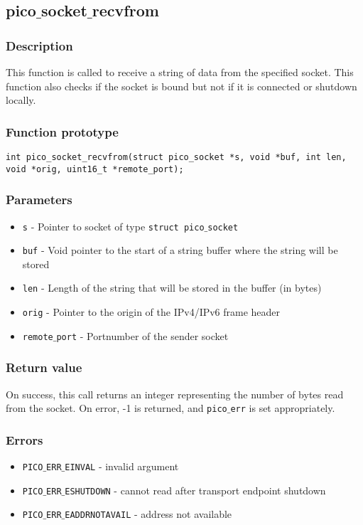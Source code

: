 \subsection{pico$\_$socket$\_$recvfrom}

\subsubsection*{Description}
This function is called to receive a string of data from the specified socket.
This function also checks if the socket is bound but not if it is connected or shutdown locally. 

\subsubsection*{Function prototype}
\begin{verbatim}
int pico_socket_recvfrom(struct pico_socket *s, void *buf, int len,
void *orig, uint16_t *remote_port);
\end{verbatim}

\subsubsection*{Parameters}
\begin{itemize}[noitemsep]
\item \texttt{s} - Pointer to socket of type \texttt{struct pico$\_$socket}
\item \texttt{buf} - Void pointer to the start of a string buffer where the string will be stored
\item \texttt{len} - Length of the string that will be stored in the buffer (in bytes)
\item \texttt{orig} - Pointer to the origin of the IPv4/IPv6 frame header
\item \texttt{remote$\_$port} - Portnumber of the sender socket 
\end{itemize}

\subsubsection*{Return value}
On success, this call returns an integer representing the number of bytes read from the socket.
On error, -1 is returned, and \texttt{pico$\_$err} is set appropriately.

\subsubsection*{Errors}
\begin{itemize}[noitemsep]
\item \texttt{PICO$\_$ERR$\_$EINVAL} - invalid argument
\item \texttt{PICO$\_$ERR$\_$ESHUTDOWN} - cannot read after transport endpoint shutdown
\item \texttt{PICO$\_$ERR$\_$EADDRNOTAVAIL} - address not available
\end{itemize}

